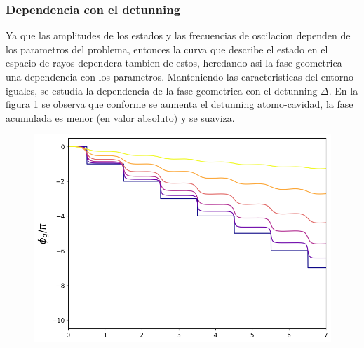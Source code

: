 \subsubsection{Dependencia con el detunning}
Ya que las amplitudes de los estados y las frecuencias de oscilacion dependen de los parametros del problema, entonces la curva que describe el estado en el espacio de rayos dependera tambien de estos, heredando asi la fase geometrica una dependencia con los parametros. Manteniendo las caracteristicas del entorno iguales, se estudia la dependencia de la fase geometrica con el detunning $\Delta$. En la figura \ref{fig3:fg detunning} se observa que conforme se aumenta el detunning atomo-cavidad, la fase acumulada es menor (en valor absoluto) y se suaviza.
\begin{figure}[H]
    \begin{minipage}[c]{0.67\textwidth}
        \includegraphics[width=\textwidth]{figuras/ch3/fg detunning.png}
    \end{minipage}\hfill
    \begin{minipage}[c]{0.3\textwidth}
    \caption{
         } \label{fig3:fg detunning}
  \end{minipage}
\end{figure}


